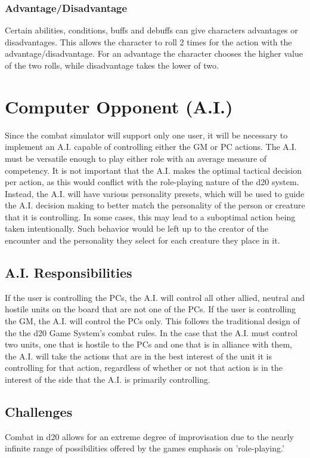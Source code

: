 \documentclass[12pt,a4paper]{report}
\begin{document}
			\subsubsection{Advantage/Disadvantage}
				Certain abilities, conditions, buffs and debuffs can give characters advantages or disadvantages. This allows the character to roll 2 times for the action with the advantage/disadvantage. For an advantage the character chooses the higher value of the two rolls, while disadvantage takes the lower of two.
\newpage
\section{Computer Opponent (A.I.)}
	Since the combat simulator will support only one user, it will be necessary to implement an A.I. capable of controlling either the GM or PC actions. The A.I. must be versatile enough to play either role with an average measure of competency. It is not important that the A.I. makes the optimal tactical decision per action, as this would conflict with the role-playing nature of the d20 system. Instead, the A.I. will have various personality presets, which will be used to guide the A.I. decision making to better match the personality of the person or creature that it is controlling. In some cases, this may lead to a suboptimal action being taken intentionally. Such behavior would be left up to the creator of the encounter and the personality they select for each creature they place in it.
	
		\subsection{A.I. Responsibilities}
		If the user is controlling the PCs, the A.I. will control all other allied, neutral and hostile units on the board that are not one of the PCs. If the user is controlling the GM, the A.I. will control the PCs only. This follows the traditional design of the the d20 Game System's combat rules. In the case that the A.I. must control two units, one that is hostile to the PCs and one that is in alliance with them, the A.I. will take the actions that are in the best interest of the unit it is controlling for that action, regardless of whether or not that action is in the interest of the side that the A.I. is primarily controlling.
		
		\subsection{Challenges}
		Combat in d20 allows for an extreme degree of improvisation due to the nearly infinite range of possibilities offered by the games emphasis on 'role-playing.' 
		
\end{document}
